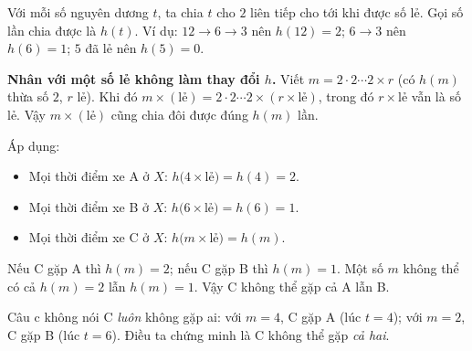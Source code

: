 {
Với mỗi số nguyên dương $t$, ta chia $t$ cho $2$ liên tiếp cho tới khi được số lẻ. Gọi số lần chia được là $h(t)$. Ví dụ: $12\to 6\to 3$ nên $h(12)=2$; $6\to3$ nên $h(6)=1$; $5$ đã lẻ nên $h(5)=0$.
\begin{proofbox}\textbf{Nhân với một số lẻ không làm thay đổi $h$.} Viết $m=2\cdot2\cdots2\times r$ (có $h(m)$ thừa số $2$, $r$ lẻ). Khi đó $m\times(\text{lẻ})=2\cdot2\cdots2\times(r\times\text{lẻ})$, trong đó $r\times\text{lẻ}$ vẫn là số lẻ. Vậy $m\times(\text{lẻ})$ cũng chia đôi được đúng $h(m)$ lần.\end{proofbox}
Áp dụng:
\begin{itemize}[leftmargin=1.3em,itemsep=1pt]
\item Mọi thời điểm xe A ở $X$: $h\big(4\times\text{lẻ}\big)=h(4)=2$.
\item Mọi thời điểm xe B ở $X$: $h\big(6\times\text{lẻ}\big)=h(6)=1$.
\item Mọi thời điểm xe C ở $X$: $h\big(m\times\text{lẻ}\big)=h(m)$.
\end{itemize}
Nếu C gặp A thì $h(m)=2$; nếu C gặp B thì $h(m)=1$. Một số $m$ không thể có cả $h(m)=2$ lẫn $h(m)=1$. Vậy C không thể gặp cả A lẫn B.
\begin{warnbox}Câu c không nói C \emph{luôn} không gặp ai: với $m=4$, C gặp A (lúc $t=4$); với $m=2$, C gặp B (lúc $t=6$). Điều ta chứng minh là C không thể gặp \emph{cả hai}.\end{warnbox}
}

